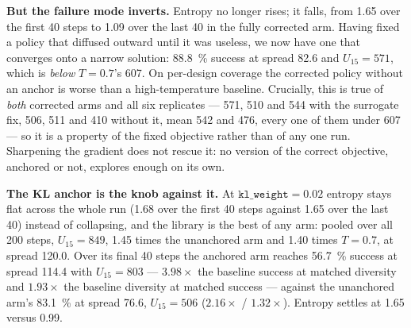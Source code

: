 \textbf{But the failure mode inverts.} Entropy no longer rises; it falls, from
1.65 over the first 40 steps to 1.09 over the last 40 in the fully corrected
arm. Having fixed a policy that diffused outward until it was useless, we now
have one that converges onto a narrow solution: \SI{88.8}{\percent} success at
spread 82.6 and $U_{15} = 571$, which is \emph{below} $T{=}0.7$'s 607. On
per-design coverage the corrected policy without an anchor is worse than a
high-temperature baseline. Crucially, this is true of \emph{both} corrected arms
and all six replicates --- 571, 510 and 544 with the surrogate fix, 506, 511 and
410 without it, mean 542 and 476, every one of them under 607 --- so it is a
property of the fixed objective rather than of any one run. Sharpening the gradient does not
rescue it: no version of the correct objective, anchored or not, explores enough
on its own.

\textbf{The KL anchor is the knob against it.} At
$\texttt{kl\_weight} = 0.02$ entropy stays flat across the whole run (1.68 over
the first 40 steps against 1.65 over the last 40) instead of collapsing, and the
library is the best of any arm: pooled over all 200 steps, $U_{15} = 849$,
\num{1.45} times the unanchored arm and \num{1.40} times $T{=}0.7$, at
spread 120.0. Over its final 40 steps the anchored arm
reaches \SI{56.7}{\percent} success at spread 114.4 with $U_{15} = 803$ ---
$\mathbf{3.98\times}$ the baseline success at matched diversity and
$\mathbf{1.93\times}$ the baseline diversity at matched success --- against the
unanchored arm's \SI{83.1}{\percent} at spread 76.6, $U_{15} = 506$
($2.16\times$ / $1.32\times$). Entropy settles at 1.65 versus 0.99.




